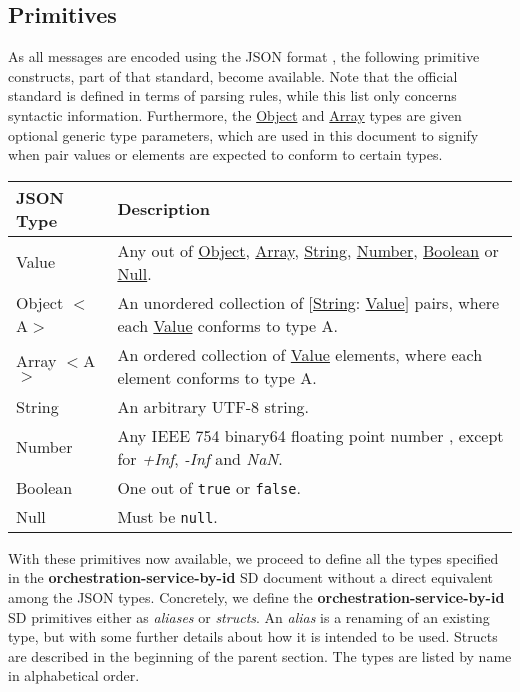 \documentclass[a4paper]{arrowhead}
\newcommand{\pdef}[1]{{\textcolor{ArrowheadGrey}{#1 \label{sec:model:primitives:#1} \label{sec:model:primitives:#1s}}}}
\newcommand{\pref}[1]{{\textcolor{ArrowheadGrey}{\hyperref[sec:model:primitives:#1]{#1}}}}
\begin{document}
\subsection{Primitives}
\label{sec:model:primitives}

As all messages are encoded using the JSON format \cite{bray2014json}, the following primitive constructs, part of that standard, become available.
Note that the official standard is defined in terms of parsing rules, while this list only concerns syntactic information.
Furthermore, the \pref{Object} and \pref{Array} types are given optional generic type parameters, which are used in this document to signify when pair values or elements are expected to conform to certain types. 

\begin{table}[ht!]
\begin{tabularx}{\textwidth}{| p{3cm} | X |} \hline
\rowcolor{gray!33} JSON Type & Description \\ \hline
\pdef{Value}                 & Any out of \pref{Object}, \pref{Array}, \pref{String}, \pref{Number}, \pref{Boolean} or \pref{Null}. \\ \hline
\pdef{Object}$<$A$>$         & An unordered collection of $[$\pref{String}: \pref{Value}$]$ pairs, where each \pref{Value} conforms to type A. \\ \hline
\pdef{Array}$<$A$>$          & An ordered collection of \pref{Value} elements, where each element conforms to type A. \\ \hline
\pdef{String}                & An arbitrary UTF-8 string. \\ \hline
\pdef{Number}                & Any IEEE 754 binary64 floating point number \cite{cowlishaw2019floating}, except for \textit{+Inf}, \textit{-Inf} and \textit{NaN}. \\ \hline
\pdef{Boolean}               & One out of \texttt{true} or \texttt{false}. \\ \hline
\pdef{Null}                  & Must be \texttt{null}. \\ \hline
\end{tabularx}
\end{table}

With these primitives now available, we proceed to define all the types specified in the \textbf{orchestration-service-by-id} SD document without a direct equivalent among the JSON types.
Concretely, we define the \textbf{orchestration-service-by-id} SD primitives either as \textit{aliases} or \textit{structs}.
An \textit{alias} is a renaming of an existing type, but with some further details about how it is intended to be used.
Structs are described in the beginning of the parent section.
The types are listed by name in alphabetical order.
\end{document}
